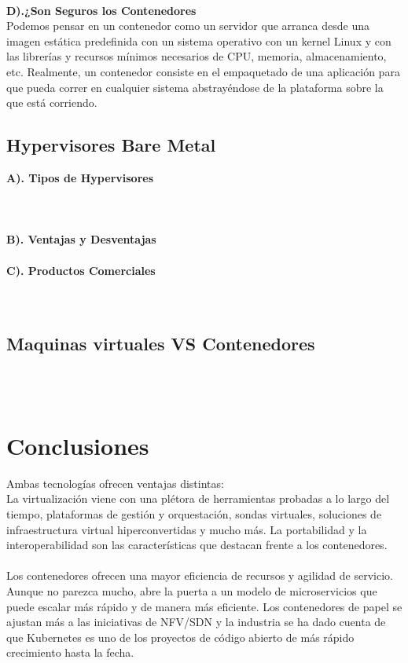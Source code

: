 \documentclass[twoside,twocolumn]{article}
\begin{document}
\begin{flushright}
\begin{itemize}
\textbf{}\\
 \textbf{D).¿Son Seguros los Contenedores}\\
\textbf{}Podemos pensar en un contenedor como un servidor que arranca desde una imagen estática predefinida con un sistema operativo con un kernel Linux y con las librerías y recursos mínimos necesarios de CPU, memoria, almacenamiento, etc. Realmente, un contenedor consiste en el empaquetado de una aplicación para que pueda correr en cualquier sistema abstrayéndose de la plataforma sobre la que está corriendo.\\



\subsection{Hypervisores Bare Metal}

 \textbf{A). Tipos de Hypervisores }\\
\textbf{}\\
\textbf{}\\
\textbf{}\\
 \textbf{B). Ventajas y Desventajas}\\
\textbf{}\\
 \textbf{C). Productos Comerciales}\\
\textbf{}\\
\textbf{}\\

\subsection{Maquinas virtuales VS Contenedores}
\textbf{}\\
\textbf{}\\



\section{Conclusiones}

Ambas tecnologías ofrecen ventajas distintas:
\textbf{}\\
La virtualización viene con una plétora de herramientas probadas a lo largo del tiempo, plataformas de gestión y orquestación, sondas virtuales, soluciones de infraestructura virtual hiperconvertidas y mucho más. La portabilidad y la interoperabilidad son las características que destacan frente a los contenedores.
\textbf{}\\
\textbf{}\\
Los contenedores ofrecen una mayor eficiencia de recursos y agilidad de servicio. Aunque no parezca mucho, abre la puerta a un modelo de microservicios que puede escalar más rápido y de manera más eficiente. Los contenedores de papel se ajustan más a las iniciativas de NFV/SDN y la industria se ha dado cuenta de que Kubernetes es uno de los proyectos de código abierto de más rápido crecimiento hasta la fecha.





\end{itemize}
\end{flushright}
\end{document}
